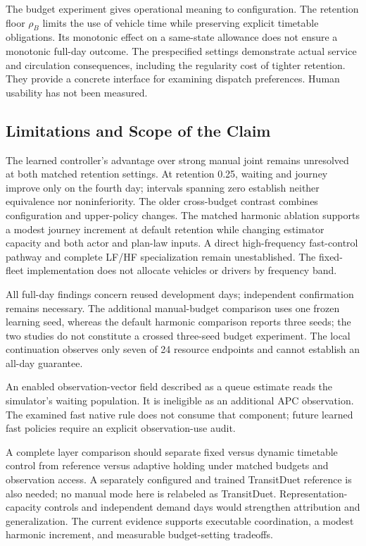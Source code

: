 The budget experiment gives operational meaning to configuration. The
retention floor $\rho_B$ limits the use of vehicle time while preserving
explicit timetable obligations. Its monotonic effect on a same-state
allowance does not ensure a monotonic full-day outcome. The prespecified
settings demonstrate actual service and circulation consequences, including
the regularity cost of tighter retention. They provide a concrete interface
for examining dispatch preferences. Human usability has not been measured.

\subsection{Limitations and Scope of the Claim}
\label{sec:limitations}

The learned controller's advantage over strong manual joint remains unresolved
at both matched retention settings. At retention 0.25, waiting and journey
improve only on the fourth day; intervals spanning zero establish neither
equivalence nor noninferiority. The older cross-budget contrast combines
configuration and upper-policy changes. The matched harmonic ablation supports
a modest journey increment at default retention while changing estimator
capacity and both actor and plan-law inputs. A direct high-frequency fast-control
pathway and complete LF/HF specialization remain unestablished. The fixed-fleet
implementation does not allocate vehicles or drivers by frequency band.

All full-day findings concern reused development days; independent confirmation
remains necessary. The additional manual-budget comparison uses one frozen
learning seed, whereas the default harmonic comparison reports three seeds;
the two studies do not constitute a crossed three-seed budget experiment.
The local continuation observes only seven of 24 resource endpoints and cannot
establish an all-day guarantee.

An enabled observation-vector field described as a queue estimate reads the
simulator's waiting population. It is ineligible as an additional APC
observation. The examined fast native rule does not consume that component;
future learned fast policies require an explicit observation-use audit.

A complete layer comparison should separate fixed versus dynamic timetable
control from reference versus adaptive holding under matched budgets and
observation access. A separately configured and trained TransitDuet reference
is also needed; no manual mode here is relabeled as TransitDuet. Representation-
capacity controls and independent demand days would strengthen attribution
and generalization. The current evidence supports executable coordination,
a modest harmonic increment, and measurable budget-setting tradeoffs.
